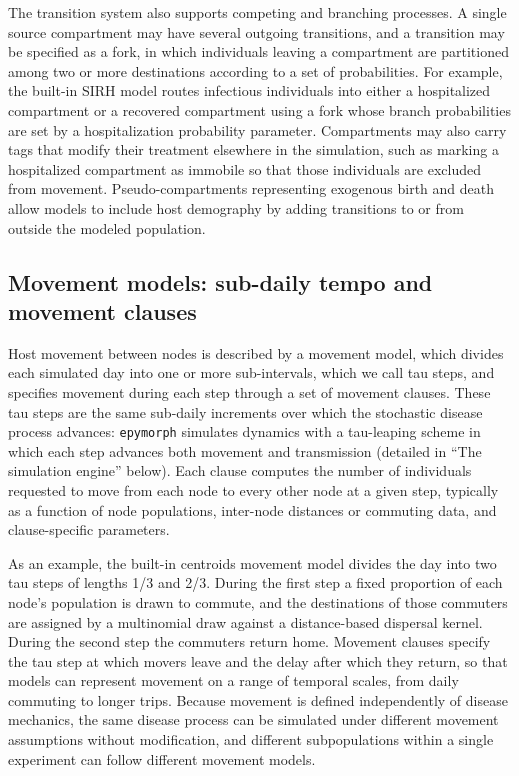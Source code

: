 The transition system also supports competing and branching processes. A single source
compartment may have several outgoing transitions, and a transition may be specified as a
fork, in which individuals leaving a compartment are partitioned among two or more
destinations according to a set of probabilities. For example, the built-in SIRH model
routes infectious individuals into either a hospitalized compartment or a recovered
compartment using a fork whose branch probabilities are set by a hospitalization probability
parameter. Compartments may also carry tags that modify their treatment elsewhere in the
simulation, such as marking a hospitalized compartment as immobile so that those individuals
are excluded from movement. Pseudo-compartments representing exogenous birth and death allow
models to include host demography by adding transitions to or from outside the modeled
population.

\subsection{Movement models: sub-daily tempo and movement clauses}

Host movement between nodes is described by a movement model, which divides each simulated
day into one or more sub-intervals, which we call tau steps, and specifies movement during
each step through a set of movement clauses. These tau steps are the same sub-daily
increments over which the stochastic disease process advances: \texttt{epymorph} simulates
dynamics with a tau-leaping scheme in which each step advances both movement and
transmission (detailed in ``The simulation engine'' below). Each clause computes the number
of individuals requested to move from each node to every other node at a given step,
typically as a function of node populations, inter-node distances or commuting data, and
clause-specific parameters.


As an example, the built-in centroids movement model divides the day into two tau steps of
lengths 1/3 and 2/3. During the first step a fixed proportion of each node's population is
drawn to commute, and the destinations of those commuters are assigned by a multinomial draw
against a distance-based dispersal kernel. During the second step the commuters return home.
Movement clauses specify the tau step at which movers leave and the delay after which they
return, so that models can represent movement on a range of temporal scales, from daily
commuting to longer trips. Because movement is defined independently of disease mechanics,
the same disease process can be simulated under different movement assumptions without
modification, and different subpopulations within a single experiment can follow different
movement models.

